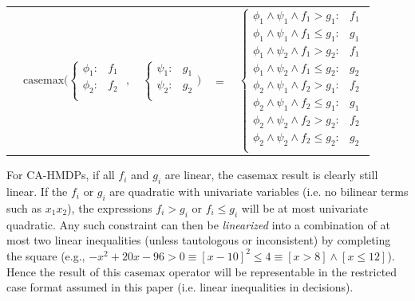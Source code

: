 \documentclass[twoside,11pt]{article}
\newcommand{\casemax}{\mathrm{casemax}}
\begin{document}
{%
\begin{center}
\begin{tabular}{r c c c l}
&
\hspace{-9mm} $\casemax \Bigg(
  \begin{cases}
    \phi_1: & f_1 \\ 
    \phi_2: & f_2 \\ 
  \end{cases}$
$,$
&
\hspace{-4mm}
  $\begin{cases}
    \psi_1: & g_1 \\ 
    \psi_2: & g_2 \\ 
  \end{cases} \Bigg)$
&
\hspace{-4mm} 
$ = $
&
\hspace{-4mm}
  $\begin{cases}
  \phi_1 \wedge \psi_1 \wedge f_1 > g_1    : & f_1 \\ 
  \phi_1 \wedge \psi_1 \wedge f_1 \leq g_1 : & g_1 \\ 
  \phi_1 \wedge \psi_2 \wedge f_1 > g_2    : & f_1 \\ 
  \phi_1 \wedge \psi_2 \wedge f_1 \leq g_2 : & g_2 \\ 
  \phi_2 \wedge \psi_1 \wedge f_2 > g_1    : & f_2 \\ 
  \phi_2 \wedge \psi_1 \wedge f_2 \leq g_1 : & g_1 \\ 
  \phi_2 \wedge \psi_2 \wedge f_2 > g_2    : & f_2 \\ 
  \phi_2 \wedge \psi_2 \wedge f_2 \leq g_2 : & g_2 \\ 
  \end{cases}$\label{symbolicMax}
\end{tabular}
\end{center}
}

For CA-HMDPs, if all $f_i$ and $g_i$ are linear, the $\casemax$ result is clearly still linear. If the $f_i$ or $g_i$ are quadratic with univariate variables (i.e. no bilinear terms such as $x_1x_2$), the expressions $f_i > g_i$ or $f_i \leq
g_i$ will be at most univariate quadratic. Any such constraint
can then be \emph{linearized} into a combination of at most 
two linear inequalities (unless tautologous or inconsistent) 
by completing the square (e.g., 
$-x^2 + 20x - 96 > 0 \equiv [x - 10]^2 \leq 4 \equiv [x > 8] \land [x \leq 12]$).  Hence
the result of this $\casemax$
operator will be representable in the restricted case format assumed in this paper
(i.e. linear inequalities in decisions). 
\end{document}
